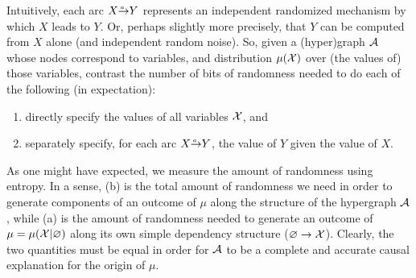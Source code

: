 Intuitively, 
    each arc $\ed aXY$ represents 
    an independent randomized mechanism by which $X$ leads to $Y$. 
Or, perhaps slightly more precisely, that $Y$ can be computed from $X$ alone (and independent random noise). 
So, given a (hyper)graph $\mathcal A$ whose nodes correspond to variables,
    and distribution $\mu(\mathcal X)$ over (the values of) those variables,
contrast the number of bits of randomness needed to do each of the following (in expectation):
%
\begin{enumerate}[label=(\alph*),nosep]
\item 
directly specify the values of all variables $\mathcal X$, and 
 \label{item:globalinfo}
\item 
separately specify, for each arc $\ed aXY$, the value
of $Y$ given the value of $X$.
	\label{item:localinfo}
\end{enumerate}
As one might have expected, we measure the amount of randomness using entropy.
In a sense, 
(b) is the total amount of randomness we need in order to generate components of an outcome of $\mu$ along the structure of the hypergraph $\mathcal A$,
while
(a) is the amount of randomness needed to generate an outcome of $\mu = \mu(\mathcal X|\varnothing)$ along its own simple dependency structure ($\varnothing \to \mathcal X$). 
Clearly, the two quantities must be equal in order for $\mathcal A$ to be a complete and accurate causal explanation for the origin of $\mu$.


